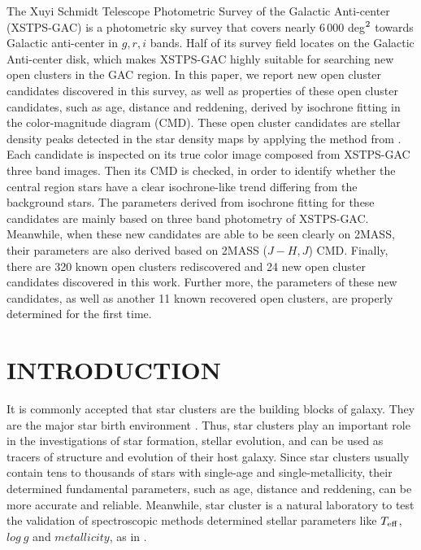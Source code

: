 \documentclass[]{raa_rb}
\begin{document}
\abstract
{The Xuyi Schmidt Telescope Photometric Survey of the Galactic Anti-center (XSTPS-GAC) is a photometric sky survey that covers nearly 6\,000 deg$^{\rm 2}$ towards Galactic anti-center in $g, r, i$ bands. Half of its survey field locates on the Galactic Anti-center disk, which makes XSTPS-GAC highly suitable for searching new open clusters in the GAC region. In this paper, we report new open cluster candidates discovered in this survey, as well as properties of these open cluster candidates, such as age, distance and reddening, derived by isochrone fitting in the color-magnitude diagram (CMD).  These open cluster candidates are stellar density peaks detected in the star density maps by applying the method from \cite{Koposov2008}.  Each candidate is inspected on its true color image composed from XSTPS-GAC three band images. Then its CMD is checked, in order to identify whether the central region stars have a clear isochrone-like trend differing from the background stars. The parameters derived from isochrone fitting for these candidates are mainly based on three band photometry of XSTPS-GAC. Meanwhile, when these new candidates are able to be seen clearly on 2MASS, their parameters are also derived based on 2MASS ($J-H,J$) CMD. Finally, there are 320 known open clusters rediscovered and 24 new open cluster candidates discovered in this work. Further more, the parameters of these new candidates, as well as another 11 known recovered open clusters, are properly determined for the first time. 
}



   \maketitle


\section{INTRODUCTION}

It is commonly accepted that star clusters are the building blocks of galaxy.  They are the major star birth environment \citep{Lada2003,deWit2005}. Thus, star clusters play an important role in the investigations of star formation, stellar evolution, and can be used as tracers of structure and evolution of their host galaxy.  Since star clusters usually contain tens to thousands of stars with single-age and single-metallicity, their determined fundamental parameters, such as age, distance and reddening, can be more accurate and reliable.  Meanwhile, star cluster is a natural laboratory to test the validation of spectroscopic methods determined stellar parameters like $T_{\rm eff}$, $log~g$ and $metallicity$, as in \cite{xiang2015}.
\end{document}

